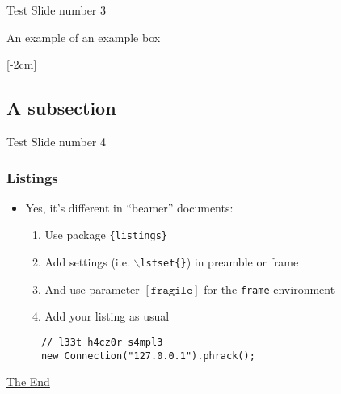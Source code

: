 \documentclass[
  en, %
  inputenc=utf8,
]{tuhhslides}
\begin{document}
\begin{frame}{Test Slide number 3}
  \begin{example}
    An example of an example box
  \end{example}

  [-2cm]
\end{frame}


\subsection{A subsection}

\begin{frame}{Test Slide number 4}
\end{frame}

\begin{frame}[fragile]
  \frametitle{Listings}
  \begin{itemize}
    \item Yes, it's different in ``beamer'' documents:
    \begin{enumerate}
      \item Use package {\tt \{listings\}} 
      \item Add settings (i.e. {\tt $\backslash$lstset\{\}}) in preamble or frame
      \item And use parameter $\left[ \texttt{fragile} \right]$ for the
      \texttt{frame} environment
      \item Add your listing as usual
    \end{enumerate}
  \end{itemize}
  
  \lstset{%
    frame=single,       %
    language=Java,      %
    basicstyle=\tiny,   %
    tabsize=2,
    showlines=true,    %
    backgroundcolor=,
    numbers=left,       %
    numberstyle=\tiny,  %
    stepnumber=1,       %
    numbersep=5pt       %
}
  
  \begin{lstlisting}
      // l33t h4cz0r s4mpl3
      new Connection("127.0.0.1").phrack();
  \end{lstlisting}

  \hyperref[sec:end]{The End}

\end{frame}
\end{document}
